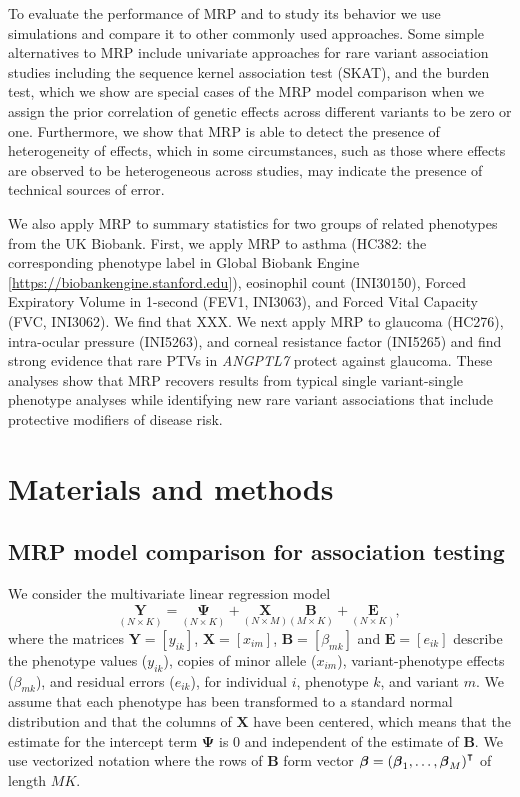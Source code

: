 To evaluate the performance of MRP and to study its behavior we use simulations and compare it to other commonly used approaches. Some simple alternatives to MRP include univariate approaches for rare variant association studies including the sequence kernel association test (SKAT)\cite{skat}, and the burden test, which we show are special cases of the MRP model comparison when we assign the prior correlation of genetic effects across different variants to be zero or one. Furthermore, we show that MRP is able to detect the presence of heterogeneity of effects, which in some circumstances, such as those where effects are observed to be heterogeneous across studies, may indicate the presence of technical sources of error. 
  
We also apply MRP to summary statistics for two groups of related phenotypes from the UK Biobank. First, we apply MRP to asthma (HC382: the corresponding phenotype label in Global Biobank Engine [\url{https://biobankengine.stanford.edu}]), eosinophil count (INI30150), Forced Expiratory Volume in 1-second (FEV1, INI3063), and Forced Vital Capacity (FVC, INI3062). We find that XXX. We next apply MRP to glaucoma (HC276), intra-ocular pressure (INI5263), and corneal resistance factor (INI5265) and find strong evidence that rare PTVs in \textit{ANGPTL7} protect against glaucoma. These analyses show that MRP recovers results from typical single variant-single phenotype analyses while identifying new rare variant associations that include protective modifiers of disease risk.

\section*{Materials and methods}
\subsection*{MRP model comparison for association testing}
We consider the multivariate linear regression model 
$$\underset{\left(N\times K\right)}{\mathbf{\textrm{Y}}} 
= \underset{\left(N\times K\right)}{\mathbf{\Psi}}  + \underset{\left(N\times M\right)}{\mathbf{\textrm{X}}}\underset{\left(M \times K\right)}{\mathbf{\textrm{B}}} 
+ \underset{\left(N\times K\right)}{\mathbf{\textrm{E}}},$$
where the matrices $\mathbf{\textrm{Y}} = \left[{y}_{i k}\right]$, $\mathbf{\textrm{X}} = \left[ x_{i m}\right]$, 
$\mathbf{\textrm{B}} = \left[ \beta_{m k} \right]$ and $\mathbf{\textrm{E}} = \left[e_{i k}\right]$  describe the phenotype values ($y_{i k}$),
copies of minor allele ($x_{i m}$), variant-phenotype effects ($\beta_{m k}$), and residual errors ($e_{i k}$), 
for individual $i$, phenotype $k$, and variant $m$. 
We assume that each phenotype has been transformed to a standard normal
distribution and that the columns of ${\mathbf{{\textrm{X}}}}$ 
have been centered, which means that the estimate for the intercept term ${\mathbf{\Psi}}$ is 0 and independent of the estimate of ${\mathbf{\textrm{B}}}$.
We use vectorized notation where the rows of ${\mathbf{\textrm{B}}}$ form vector 
$\boldsymbol {{ \beta}} = \left(\boldsymbol {{ \beta}}_{1},\dots,\boldsymbol {{\beta}}_{M}\right)^{\intercal}$
of length $MK$.

